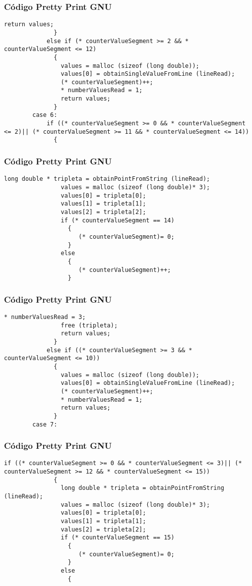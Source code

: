 \documentclass{beamer}
\begin{document}
\begin{frame}[fragile]
\frametitle{C\'odigo Pretty Print GNU}
\begin{lstlisting}[style=CStyle]
                return values;
              }
            else if (* counterValueSegment >= 2 && * counterValueSegment <= 12)
              {
                values = malloc (sizeof (long double));
                values[0] = obtainSingleValueFromLine (lineRead);
                (* counterValueSegment)++;
                * numberValuesRead = 1;
                return values;
              }
        case 6:
            if ((* counterValueSegment >= 0 && * counterValueSegment <= 2)|| (* counterValueSegment >= 11 && * counterValueSegment <= 14))
              {
                \end{lstlisting}
\end{frame}
\begin{frame}[fragile]
\frametitle{C\'odigo Pretty Print GNU}
\begin{lstlisting}[style=CStyle]
                long double * tripleta = obtainPointFromString (lineRead);
                values = malloc (sizeof (long double)* 3);
                values[0] = tripleta[0];
                values[1] = tripleta[1];
                values[2] = tripleta[2];
                if (* counterValueSegment == 14)
                  {
                     (* counterValueSegment)= 0;
                  }
                else
                  {
                     (* counterValueSegment)++;
                  }
\end{lstlisting}
\end{frame}
\begin{frame}[fragile]
\frametitle{C\'odigo Pretty Print GNU}
\begin{lstlisting}[style=CStyle]
                * numberValuesRead = 3;
                free (tripleta);
                return values;
              }
            else if ((* counterValueSegment >= 3 && * counterValueSegment <= 10))
              {
                values = malloc (sizeof (long double));
                values[0] = obtainSingleValueFromLine (lineRead);
                (* counterValueSegment)++;
                * numberValuesRead = 1;
                return values;
              }
        case 7:
\end{lstlisting}
\end{frame}
\begin{frame}[fragile]
\frametitle{C\'odigo Pretty Print GNU}
\begin{lstlisting}[style=CStyle]
            if ((* counterValueSegment >= 0 && * counterValueSegment <= 3)|| (* counterValueSegment >= 12 && * counterValueSegment <= 15))
              {
                long double * tripleta = obtainPointFromString (lineRead);
                values = malloc (sizeof (long double)* 3);
                values[0] = tripleta[0];
                values[1] = tripleta[1];
                values[2] = tripleta[2];
                if (* counterValueSegment == 15)
                  {
                     (* counterValueSegment)= 0;
                  }
                else
                  {
                    \end{lstlisting}
\end{frame}
\end{document}
